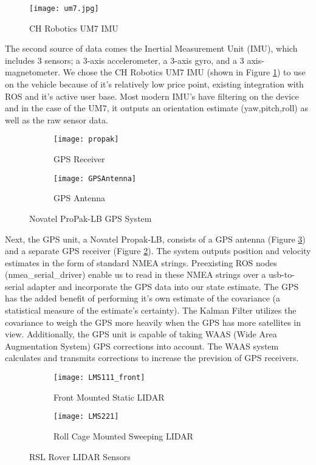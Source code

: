\begin{figure}[H]
	\centerline{\texttt{[image: um7.jpg]}}
	\caption[]{CH Robotics UM7 IMU}
	\label{fig:imu}
\end{figure}

The second source of data comes the Inertial Measurement Unit (IMU), which includes 3 sensors; a 3-axis accelerometer, a 3-axis gyro, and a 3 axis-magnetometer. We chose the CH Robotics UM7 IMU (shown in Figure \ref{fig:imu}) to use on the vehicle because of it's relatively low price point, existing integration with ROS and it's active user base. Most modern IMU's have filtering on the device and in the case of the UM7, it outputs an orientation estimate (yaw,pitch,roll) as well as the raw sensor data. 

\begin{figure}[H]
\centering
\begin{subfigure}{.5\textwidth}
	\centering
	\texttt{[image: propak]}
	\caption{GPS Receiver}
	\label{fig:gpsrec}
\end{subfigure}%
\begin{subfigure}{.5\textwidth}
	\centering
	\texttt{[image: GPSAntenna]}
	\caption{GPS Antenna}
	\label{fig:gpsant}
\end{subfigure}
\caption{Novatel ProPak-LB GPS System}
\label{fig:gps}
\end{figure}

Next, the GPS unit, a Novatel Propak-LB, consists of a GPS antenna (Figure \ref{fig:gpsant}) and a separate GPS receiver (Figure \ref{fig:gpsrec}). The system outputs position and velocity estimates in the form of standard NMEA strings. Preexisting ROS nodes (nmea\_serial\_driver) enable us to read in these NMEA strings over a usb-to-serial adapter and incorporate the GPS data into our state estimate. The GPS has the added benefit of performing it's own estimate of the covariance (a statistical measure of the estimate's certainty). The Kalman Filter utilizes the covariance to weigh the GPS more heavily when the GPS has more satellites in view. Additionally, the GPS unit is capable of taking WAAS (Wide Area Augmentation System) GPS corrections into account. The WAAS system calculates and transmits corrections to increase the prevision of GPS receivers.

\begin{figure}[H]
	\centering
	\begin{subfigure}{.5\textwidth}
		\centering
		\texttt{[image: LMS111\_front]}
		\caption{Front Mounted Static LIDAR}
		\label{fig:lidar_front}
	\end{subfigure}%
	\begin{subfigure}{.5\textwidth}
		\centering
		\texttt{[image: LMS221]}
		\caption{Roll Cage Mounted Sweeping LIDAR}
		\label{fig:lidar_scanning}
	\end{subfigure}
	\caption{RSL Rover LIDAR Sensors}
	\label{fig:lidar}
\end{figure}

